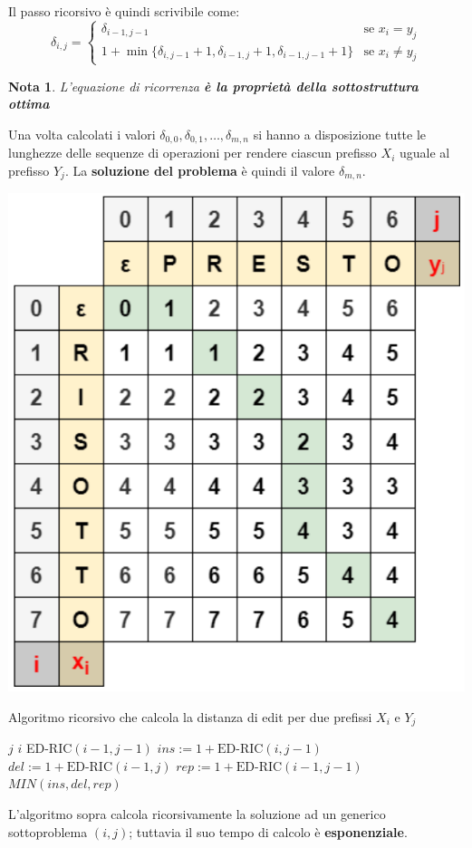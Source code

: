 \documentclass[12pt]{article}
\newtheorem{Nota}{Nota}[subsection]
\begin{document}
Il passo ricorsivo è quindi scrivibile come:
\begin{equation*}
    \delta_{i,j} = \begin{cases}
        \delta_{i-1, j-1} & \textrm{se } x_i = y_j \\
        1 + \min\{\delta_{i, j-1} + 1, \delta_{i-1, j} + 1, \delta_{i-1,j-1} + 1\} & \textrm{se } x_i \neq y_j
    \end{cases}
\end{equation*}
\begin{Nota}
    L'equazione di ricorrenza \textbf{è la proprietà della sottostruttura ottima}
\end{Nota}
Una volta calcolati i valori $\delta_{0,0}, \delta_{0,1}, \dots,\delta_{m,n}$ si hanno a disposizione tutte le lunghezze delle sequenze di operazioni per rendere ciascun prefisso $X_i$ uguale al prefisso $Y_j$.
La \textbf{soluzione del problema} è quindi il valore $\delta_{m,n}$.
\begin{center}
    \includegraphics[width = 0.40\linewidth]{Images/12.png}
\end{center}
\begin{algorithm}[H]
    \caption{Algoritmo ricorsivo che calcola la distanza di edit per due prefissi $X_i$ e $Y_j$}
    \DontPrintSemicolon
     {
         {
             {
                \Return $j$
            } {
                \Return $i$
            }
        } {
             {
                \Return ED-RIC$(i-1, j-1)$
            } {
                $ins := 1 + \textrm{ED-RIC}(i, j-1)$ \;
                $del := 1 + \textrm{ED-RIC}(i-1, j)$ \;
                $rep := 1 + \textrm{ED-RIC}(i-1, j-1)$ \;
                \Return $MIN(ins, del, rep)$
            }
        }
    }
\end{algorithm} \noindent
L'algoritmo sopra calcola ricorsivamente la soluzione ad un generico sottoproblema $(i,j)$; tuttavia il suo tempo di calcolo è \textbf{esponenziale}.
\end{document}
